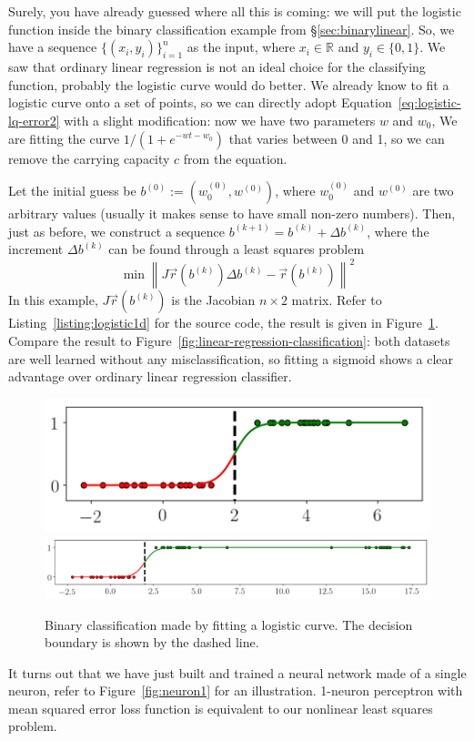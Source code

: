 \documentclass[notitlepage,oneside]{book}
\begin{document}
Surely, you have already guessed where all this is coming: we will put the logistic function inside the binary classification example from \S\ref{sec:binarylinear}.
So, we have a sequence $\{(x_i, y_i)\}_{i=1}^n$ as the input, where $x_i\in\mathbb R$ and $y_i\in \{0,1\}$.
We saw that ordinary linear regression is not an ideal choice for the classifying function,
probably the logistic curve would do better.
We already know to fit a logistic curve onto a set of points,
so we can directly adopt Equation~\eqref{eq:logistic-lq-error2} with a slight modification: now we have two parameters $w$ and $w_0$,
We are fitting the curve $1/(1+e^{-wt - w_0})$ that varies between 0 and 1, so we can remove the carrying capacity $c$ from the equation.

Let the initial guess be $b^{(0)} := \left(w_0^{(0)}, w^{(0)}\right)$, where $w_0^{(0)}$ and $w^{(0)}$ are two arbitrary values (usually it makes sense to have small non-zero numbers).
Then, just as before, we construct a sequence $b^{(k+1)} = b^{(k)} + \Delta b^{(k)}$,
where the increment $\Delta b^{(k)}$ can be found through a least squares problem
$$
\min \left\| J\vec{r}\left(b^{(k)}\right) \Delta b^{(k)} - \vec{r}\left(b^{(k)}\right) \right\|^2
$$
In this example, $J\vec{r}\left(b^{(k)}\right)$ is the Jacobian $n\times 2$ matrix.
Refer to Listing~\ref{listing:logistic1d} for the source code, the result is given in Figure~\ref{fig:logistic-vs-linear}.
Compare the result to Figure~\ref{fig:linear-regression-classification}: both datasets are well learned without any misclassification,
so fitting a sigmoid shows a clear advantage over ordinary linear regression classifier.

\begin{figure}[htb]
    \centering
    \includegraphics[width=.305\linewidth]{logistic-1d-a.png}
    \includegraphics[width=.64\linewidth]{logistic-1d-b.png}
    \caption{Binary classification made by fitting a logistic curve. The decision boundary is shown by the dashed line.}
    \label{fig:logistic-vs-linear}
\end{figure}

It turns out that we have just built and trained a neural network made of a single neuron, refer to Figure~\ref{fig:neuron1} for an illustration.
1-neuron perceptron with mean squared error loss function is equivalent to our nonlinear least squares problem.
\end{document}
